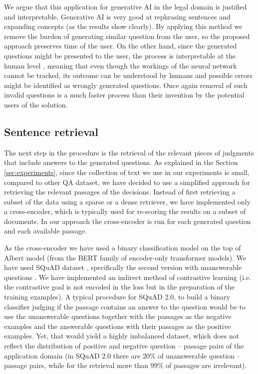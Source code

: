 We argue that this application for generative AI in the legal domain is justified and interpretable. 
Generative AI is very good at rephrasing sentences and expanding concepts (as the results show clearly). 
By applying this method we remove the burden of generating similar question from the user, 
so the proposed approach preserves time of the user. On the other hand, since the generated questions 
might be presented to the user, the process is interpretable at the human level \cite{martinez2023survey}, meaning that
even though the workings of the neural network cannot be tracked, its outcome can be understood by humans and 
possible errors might be identified as wrongly generated questions. Once again removal of such invalid questions 
is a much faster process than their invention by the potential users of the solution.

\subsection{Sentence retrieval}

The next step in the procedure is the retrieval of the relevant pieces of judgments that include answers to the
generated questions. As explained in the Section \ref{sec:experiments}, since the collection of text we use in our experiments
is small, compared to other QA dataset, we have decided to use a simplified approach for retrieving the relevant
passages of the decisions. Instead of first retrieving a subset of the data using a sparse or a dense retriever,
we have implemented only a cross-encoder, which is typically used for re-scoring the results on a subset of documents.
In our approach the cross-encoder is run for each generated question and each available passage. 

As the cross-encoder we have used a binary classification model on the top of Albert \cite{lan2019albert} model (from the BERT family
\cite{devlin2018bert} of encoder-only transformer models). We have used SQuAD dataset \cite{rajpurkar2016squad},
specifically the second version with unanswerable questions \cite{rajpurkar2018know}. We have implemented
an indirect method of contrastive learning (i.e. the contrastive goal is not encoded in the loss but in the preparation of
the  training examples). A typical procedure for SQuAD 2.0, to build a binary classifier judging if the passage 
contains an answer to the question would be to use the unanswerable questions together with the passages as the 
negative examples and the answerable questions with their passages as the positive examples. Yet, that would yield
a highly imbalanced dataset, which does not reflect the distribution of positive and negative question -- passage 
pairs of the application domain (in SQuAD 2.0 there are 20\% of unanswerable question -- passage pairs, while 
for the retrieval more than 99\% of passages are irrelevant). 

